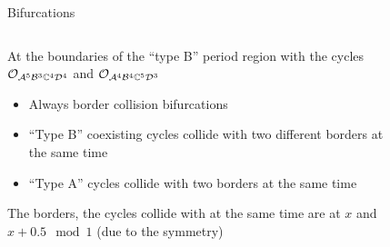 \begin{frame}{Bifurcations}
    \begin{columns}
        \begin{column}{.5 \textwidth}
            At the boundaries of the ``type B'' period region with the cycles $\mathcal{O}_{\mathcal{A}^5\mathcal{B}^3\mathbb{C}^4\mathcal{D}^4}$ and $\mathcal{O}_{\mathcal{A}^4\mathcal{B}^4\mathbb{C}^5\mathcal{D}^3}$
            \vspace{1em}
            \begin{itemize}
                \item Always border collision bifurcations
                \item ``Type B'' coexisting cycles collide with two different borders at the same time
                \item ``Type A'' cycles collide with two borders at the same time
            \end{itemize}
            \vspace{1em}
            The borders, the cycles collide with at the same time are at $x$ and $x + 0.5 \mod 1$ (due to the symmetry)
        \end{column}
        \begin{column}{.5 \textwidth}
            \vspace{-2em}
            \begin{figure}
                \centering
                \quad
                \\
                \quad
            \end{figure}
        \end{column}
    \end{columns}
\end{frame}

